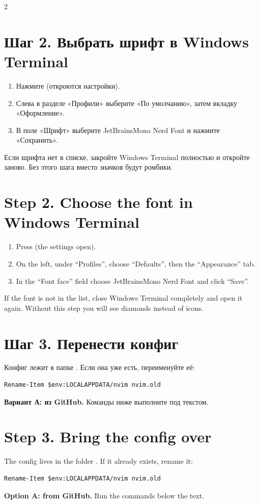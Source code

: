 \begin{paracol}{2}
\RU
\section*{Шаг 2. Выбрать шрифт в Windows Terminal}
\begin{enumerate}\setlength\itemsep{1pt}
\item Нажмите  (откроются настройки).
\item Слева в разделе «Профили» выберите «По умолчанию», затем вкладку «Оформление».
\item В поле «Шрифт» выберите JetBrainsMono Nerd Font и нажмите «Сохранить».
\end{enumerate}
Если шрифта нет в списке, закройте Windows Terminal полностью и откройте заново. Без этого шага вместо значков будут ромбики.
\switchcolumn
\EN
\section*{Step 2. Choose the font in Windows Terminal}
\begin{enumerate}\setlength\itemsep{1pt}
\item Press  (the settings open).
\item On the left, under ``Profiles'', choose ``Defaults'', then the ``Appearance'' tab.
\item In the ``Font face'' field choose JetBrainsMono Nerd Font and click ``Save''.
\end{enumerate}
If the font is not in the list, close Windows Terminal completely and open it again. Without this step you will see diamonds instead of icons.
\switchcolumn*

\RU
\section*{Шаг 3. Перенести конфиг}
Конфиг лежит в папке . Если она уже есть, переименуйте её:
\begin{lstlisting}
Rename-Item $env:LOCALAPPDATA/nvim nvim.old
\end{lstlisting}
\textbf{Вариант А: из GitHub.} Команды ниже выполните под текстом.
\switchcolumn
\EN
\section*{Step 3. Bring the config over}
The config lives in the folder . If it already exists, rename it:
\begin{lstlisting}
Rename-Item $env:LOCALAPPDATA/nvim nvim.old
\end{lstlisting}
\textbf{Option A: from GitHub.} Run the commands below the text.
\end{paracol}

